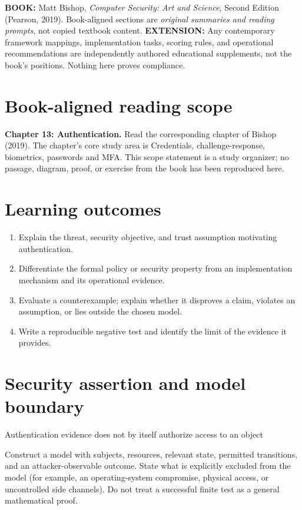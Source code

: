 \documentclass[10pt,letterpaper]{article}
\begin{document}
\makedoctocpage
\begin{notebox}
\textbf{BOOK:} Matt Bishop, \emph{Computer Security: Art and Science}, Second Edition (Pearson, 2019). Book-aligned sections are \emph{original summaries and reading prompts}, not copied textbook content.
\textbf{EXTENSION:} Any contemporary framework mappings, implementation tasks, scoring rules, and operational recommendations are independently authored educational supplements, not the book's positions. Nothing here proves compliance.
\end{notebox}
\section{Book-aligned reading scope}
\textbf{Chapter 13: Authentication.} Read the corresponding chapter of Bishop (2019). The chapter's core study area is Credentials, challenge-response, biometrics, passwords and MFA. This scope statement is a study organizer; no passage, diagram, proof, or exercise from the book has been reproduced here.
\section{Learning outcomes}
\begin{enumerate}
\item Explain the threat, security objective, and trust assumption motivating authentication.
\item Differentiate the formal policy or security property from an implementation mechanism and its operational evidence.
\item Evaluate a counterexample; explain whether it disproves a claim, violates an assumption, or lies outside the chosen model.
\item Write a reproducible negative test and identify the limit of the evidence it provides.
\end{enumerate}
\section{Security assertion and model boundary}
\begin{infobox}
Authentication evidence does not by itself authorize access to an object
\end{infobox}
Construct a model with subjects, resources, relevant state, permitted transitions, and an attacker-observable outcome. State what is explicitly excluded from the model (for example, an operating-system compromise, physical access, or uncontrolled side channels). Do not treat a successful finite test as a general mathematical proof.
\end{document}
